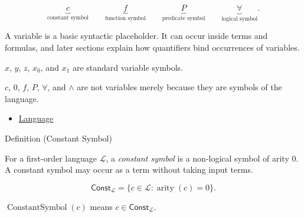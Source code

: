 \begin{remark*}
\[
\underbrace{c}_{\text{constant symbol}}
\qquad
\underbrace{f}_{\text{function symbol}}
\qquad
\underbrace{P}_{\text{predicate symbol}}
\qquad
\underbrace{\forall}_{\text{logical symbol}}.
\]
\end{remark*}

\begin{remark*}[Interpretation]
A variable is a basic syntactic placeholder. It can occur inside terms and
formulas, and later sections explain how quantifiers bind occurrences of
variables.
\end{remark*}

\begin{remark*}[Examples]
\(x\), \(y\), \(z\), \(x_0\), and \(x_1\) are standard variable symbols.
\end{remark*}

\begin{remark*}
\(c\), \(0\), \(f\), \(P\), \(\forall\), and \(\land\) are not variables merely
because they are symbols of the language.
\end{remark*}

\begin{dependencies}
\begin{itemize}
  \item \hyperref[def:language]{Language}
\end{itemize}
\end{dependencies}

\begin{definitionbox}{Definition (Constant Symbol)}
\begin{definition}
\label{def:constant-symbol}
For a first-order language \(\mathcal L\), a \emph{constant symbol} is a
non-logical symbol of arity \(0\). A constant symbol may occur as a term without
taking input terms.
\end{definition}
\end{definitionbox}

\begin{remark*}
\[
\mathsf{Const}_{\mathcal L}
=
\{c\in\mathcal L : \operatorname{arity}(c)=0\}.
\]
\end{remark*}

\begin{remark*}
\(\operatorname{ConstantSymbol}(c)\) means
\(c\in\mathsf{Const}_{\mathcal L}\).
\end{remark*}

